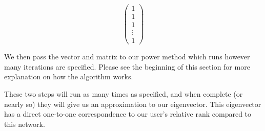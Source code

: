         \begin{equation}\label{matrix:startingA}
            \begin{pmatrix}
                1\\
                1\\
                1\\
                \vdots\\
                1
            \end{pmatrix}
        \end{equation}

    We then pass the vector and matrix to our power method which runs however many iterations are specified. Please see the beginning of this section for more explanation on how the algorithm works.


    These two steps will run as many times as specified, and when complete (or nearly so) they will give us an approximation to our eigenvector. This eigenvector has a direct one-to-one correspondence to our user's relative rank compared to this network.
